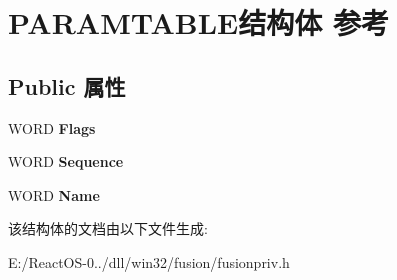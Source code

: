 \hypertarget{struct_p_a_r_a_m_t_a_b_l_e}{}\section{P\+A\+R\+A\+M\+T\+A\+B\+L\+E结构体 参考}
\label{struct_p_a_r_a_m_t_a_b_l_e}
\subsection*{Public 属性}
\begin{DoxyCompactItemize}
\item 
\mbox{\label{struct_p_a_r_a_m_t_a_b_l_e_ab5d939c54a9e78275340155dae159a50}} 
W\+O\+RD {\bfseries Flags}
\item 
\mbox{\label{struct_p_a_r_a_m_t_a_b_l_e_a6d5f0e83e9e7dec348214344118c5887}} 
W\+O\+RD {\bfseries Sequence}
\item 
\mbox{\label{struct_p_a_r_a_m_t_a_b_l_e_a6796babe7c2459e7bf82980d25660e76}} 
W\+O\+RD {\bfseries Name}
\end{DoxyCompactItemize}


该结构体的文档由以下文件生成\+:\begin{DoxyCompactItemize}
\item 
E\+:/\+React\+O\+S-\/0../dll/win32/fusion/fusionpriv.\+h\end{DoxyCompactItemize}
